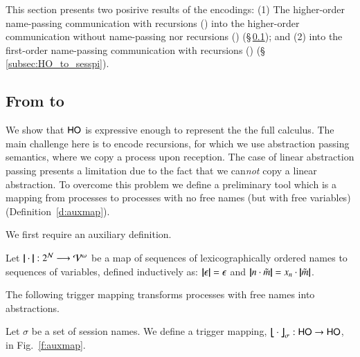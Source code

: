 \noi This section presents two posirive results of the encodings:
(1) The higher-order name-passing communication with recursions (\HOp) into 
the higher-order communication without name-passing nor 
recursions (\HO) (\S\,\ref{subsec:HOpi_to_HO}); and (2) 
\HOp into the first-order name-passing communication
with recursions (\sessp) (\S\,\ref{subsec:HO_to_sesspi}). 

\subsection{From \HOp to \HO}
\label{subsec:HOpi_to_HO}
\noi We show that $\mathsf{HO}$ is expressive enough to
represent the the full \HOp calculus.
The main challenge here is to encode recursions, 
for which 
we use abstraction passing semantics, where
we copy a process upon reception. The case of linear abstraction passing
presents a limitation due to the fact that we can{\em not} 
copy a linear abstraction.
To overcome this problem we define a preliminary tool which is a mapping from
processes to processes with no free names (but with free variables) (Definition~\ref{d:auxmap}). 

We first require an auxiliary definition.

\smallskip 

\begin{definition}\rm 
\label{def:hop_to_ho}
	Let $|\!|\cdot|\!|: 2^{\mathcal{N}} \longrightarrow \mathcal{V}^\omega$
	be a map of sequences of 
lexicographically ordered names to sequences of variables, defined
	inductively as: 
	$|\!|\epsilon|\!| = \epsilon$ and $|\!|n \cdot \tilde{m}|\!| = x_n \cdot |\!|\tilde{m}|\!|$. 
\end{definition}

\smallskip 

\noi The following trigger mapping transforms processes
with free names into abstractions. 

\smallskip 

\begin{definition} \label{d:trabs}\label{d:auxmap}
	Let $\sigma$ be a set of session names.
	We define a trigger mapping,  
$\big\lfloor\!\!\big\lfloor\cdot\big\rfloor\!\!\big\rfloor^{}_\sigma: \mathsf{HO} \to \mathsf{HO}$, in Fig.~\ref{f:auxmap}.
\end{definition}

